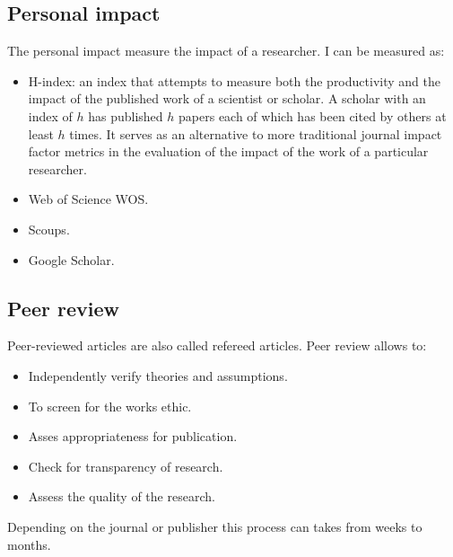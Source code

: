 	\subsection{Personal impact}
	The personal impact measure the impact of a researcher.
	I can be measured as:

	\begin{multicols}{2}
		\begin{itemize}
			\item H-index: an index that attempts to measure both the productivity and the impact of the published work of a scientist or scholar.
				A scholar with an index of $h$ has published $h$ papers each of which has been cited by others at least $h$ times.
				It serves as an alternative to more traditional journal impact factor metrics in the evaluation of the impact of the work of a particular researcher.
			\item Web of Science WOS.
			\item Scoups.
			\item Google Scholar.
		\end{itemize}
	\end{multicols}

	\subsection{Peer review}
	Peer-reviewed articles are also called refereed articles.
	Peer review allows to:

	\begin{multicols}{2}
		\begin{itemize}
			\item Independently verify theories and assumptions.
			\item To screen for the works ethic.
			\item Asses appropriateness for publication.
			\item Check for transparency of research.
			\item Assess the quality of the research.
		\end{itemize}
	\end{multicols}

	Depending on the journal or publisher this process can takes from weeks to months.
